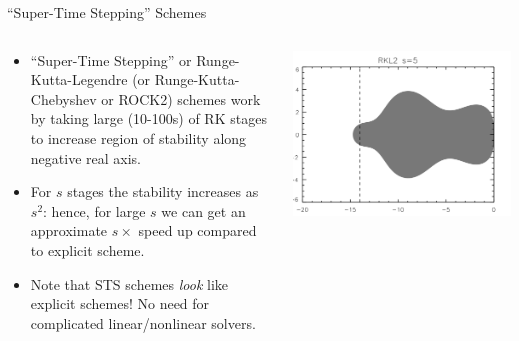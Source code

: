 \documentclass[aspectratio=169]{beamer}
\newcommand{\mypause}{}
\begin{document}
\begin{frame}{``Super-Time Stepping'' Schemes}
  \begin{columns}
  
    \begin{column}{0.5\linewidth}
      \begin{itemize}
      \item ``Super-Time Stepping'' or Runge-Kutta-Legendre (or
        Runge-Kutta-Chebyshev or ROCK2) schemes work by taking large
        (10-100s) of RK stages to increase region of stability along
        negative real axis.%
        \mypause%
      \item For $s$ stages the stability increases as $s^2$: hence,
        for large $s$ we can get an approximate $s\times$ speed up
        compared to explicit scheme.%
        \mypause%
      \item Note that STS schemes \emph{look} like explicit schemes!
        No need for complicated linear/nonlinear solvers.
      \end{itemize}
    \end{column}
    
    \begin{column}{0.5\linewidth}
      \includegraphics[width=\linewidth]{STS-RKL-5.png}
    \end{column}

  \end{columns}
\end{frame}
\end{document}
